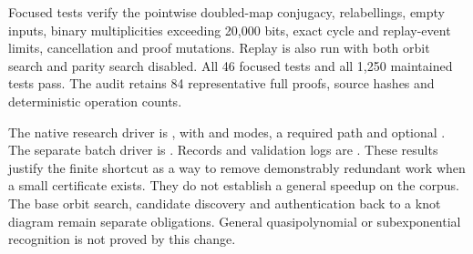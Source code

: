 Focused tests verify the pointwise doubled-map conjugacy, relabellings,
empty inputs, binary multiplicities exceeding 20,000 bits, exact cycle
and replay-event limits, cancellation and proof mutations. Replay is also
run with both orbit search and parity search disabled. All 46 focused
tests and all 1,250 maintained tests pass. The audit retains 84 representative
full proofs, source hashes and deterministic operation counts.


The native research driver is
, with 
and  modes, a required  path and optional
. The separate batch driver is
. Records and validation logs
are . These results justify the finite shortcut
as a way to remove demonstrably redundant work when a small certificate
exists. They do not establish a general speedup on the corpus. The base
orbit search, candidate discovery and authentication back to a knot diagram
remain separate obligations. General quasipolynomial or subexponential
recognition is not proved by this change.
